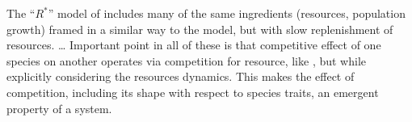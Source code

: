 \documentclass[a4paper,11pt]{article}
\newcommand{\Rstar}{\ensuremath{R^*}}
\begin{document}
%
The ``\Rstar'' model of \citet{Tilman-1982} includes many of the same
ingredients (resources, population growth) framed in a similar way to
the \citet{MacArthur-1967} model, but with slow replenishment of
resources.
\ldots
%
Important point in all of these is that competitive effect of one
species on another operates via competition for resource, like
\citet{MacArthur-1967}, but while explicitly considering the resources
dynamics.  This makes the effect of competition, including its shape
with respect to species traits, an emergent property of a system.

%
%

%
%
\end{document}
